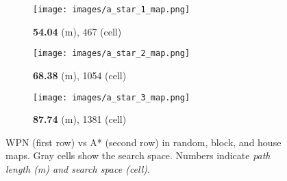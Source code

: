 \documentclass[journal, twocolumn]{IEEEtran}
\begin{document}
\begin{figure}[]
  \vspace{.5 mm}    
  \begin{subfigure}[b]{0.01\linewidth}
  \centering
    \caption*{}
    \end{subfigure}
  \hfill
  \begin{subfigure}[b]{0.31\linewidth}
    \texttt{[image: images/a\_star\_1\_map.png]}
    \caption{\scriptsize \textbf{54.04} (m), 467 (cell)}
  \end{subfigure}
  \hfill
  \begin{subfigure}[b]{0.31\linewidth}
    \texttt{[image: images/a\_star\_2\_map.png]}
    \caption{\scriptsize \textbf{68.38} (m), 1054 (cell)}
  \end{subfigure}
  \hfill
  \begin{subfigure}[b]{0.31\linewidth}
    \texttt{[image: images/a\_star\_3\_map.png]}
    \caption{\scriptsize \textbf{87.74} (m), 1381 (cell)}
  \end{subfigure}
    \vspace{.5 mm} 
  \caption{WPN (first row) vs A* (second row) in random, block, and house maps. Gray cells show the search space. Numbers indicate \emph{path length (m) and search space (cell)}.}
  \label{fig: Way runs comp}
\end{figure}
\end{document}
